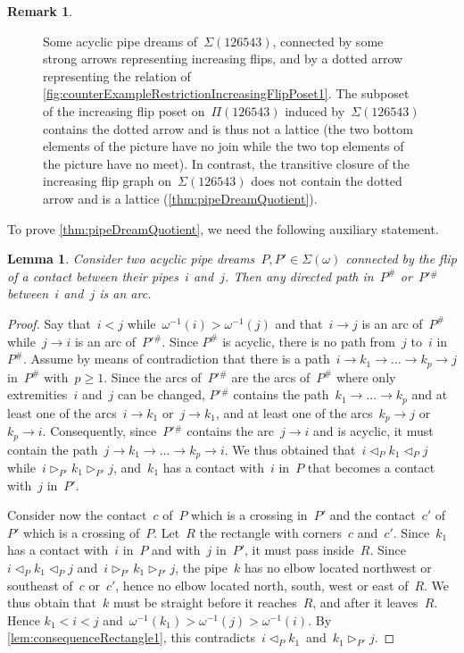 \documentclass[reqno]{amsart}
\newtheorem{lemma}[theorem]{Lemma}
\theoremstyle{definition}
\newtheorem{remark}[theorem]{Remark}
\newcommand{\pipeDreams}{\Pi} %
\newcommand{\contact}{^\#} %
\newcommand{\acyclicPipeDreams}{\Sigma} %
\newcommand{\less}{\vartriangleleft} %
\newcommand{\more}{\vartriangleright} %
\newcommand{\contactLess}[1]{\less_{#1}} %
\newcommand{\contactMore}[1]{\more_{#1}} %
\begin{document}
\begin{remark}
\begin{figure}[ht]
	\caption{Some acyclic pipe dreams of~$\acyclicPipeDreams(126543)$, connected by some strong arrows representing increasing flips, and by a dotted arrow representing the relation of \cref{fig:counterExampleRestrictionIncreasingFlipPoset1}. The subposet of the increasing flip poset on~$\pipeDreams(126543)$ induced by~$\acyclicPipeDreams(126543)$ contains the dotted arrow and is thus not a lattice (the two bottom elements of the picture have no join while the two top elements of the picture have no meet). In contrast, the transitive closure of the increasing flip graph on~$\acyclicPipeDreams(126543)$ does not contain the dotted arrow and is a lattice (\cref{thm:pipeDreamQuotient}).}
	\label{fig:counterExampleRestrictionIncreasingFlipPoset2}
\end{figure}
\end{remark}

To prove \cref{thm:pipeDreamQuotient}, we need the following auxiliary statement.

\begin{lemma}
\label{lem:flippable}
Consider two acyclic pipe dreams~$P,P' \in \acyclicPipeDreams(\omega)$ connected by the flip of a contact between their pipes~$i$ and~$j$.
Then any directed path in~$P\contact$ or~$P'{}\contact$ between~$i$ and~$j$ is an arc.
\end{lemma}

\begin{proof}
Say that~$i < j$ while~$\omega^{-1}(i) > \omega^{-1}(j)$ and that~$i \to j$ is an arc of~$P\contact$ while~$j \to i$ is an arc of~$P'{}\contact$.
Since $P\contact$ is acyclic, there is no path from~$j$ to~$i$ in~$P\contact$.
Assume by means of contradiction that there is a path~$i \to k_1 \to \dots \to k_p \to j$ in~$P\contact$ with~$p \ge 1$.
Since the arcs of~$P'{}\contact$ are the arcs of~$P\contact$ where only extremities~$i$ and~$j$ can be changed, $P'{}\contact$ contains the path~$k_1 \to \dots \to k_p$ and at least one of the arcs~$i \to k_1$ or~$j \to k_1$, and at least one of the arcs~$k_p \to j$ or~$k_p \to i$.
Consequently, since~$P'{}\contact$ contains the arc~$j \to i$ and is acyclic, it must contain the path~$j \to k_1 \to \dots \to k_p \to i$.
We thus obtained that~$i \contactLess{P} k_1 \contactLess{P} j$ while~$i \contactMore{P'} k_1 \contactMore{P'} j$, and~$k_1$ has a contact with~$i$ in~$P$ that becomes a contact with~$j$ in~$P'$.

Consider now the contact~$c$ of~$P$ which is a crossing in~$P'$ and the contact~$c'$ of~$P'$ which is a crossing of~$P$.
Let~$R$ the rectangle with corners~$c$ and~$c'$.
Since~$k_1$ has a contact with~$i$ in~$P$ and with~$j$ in~$P'$, it must pass inside~$R$.
Since~$i \contactLess{P} k_1 \contactLess{P} j$ and~$i \contactMore{P'} k_1 \contactMore{P'} j$, the pipe~$k$ has no elbow located northwest or southeast of~$c$ or~$c'$, hence no elbow located north, south, west or east of~$R$.
We thus obtain that~$k$ must be straight before it reaches~$R$, and after it leaves~$R$.
Hence $k_1 < i < j$ and~$\omega^{-1}(k_1) > \omega^{-1}(j) > \omega^{-1}(i)$.
By \cref{lem:consequenceRectangle1}, this contradicts~$i \contactLess{P} k_1$~and~$k_1 \contactMore{P'} j$.
\end{proof}
\end{document}
